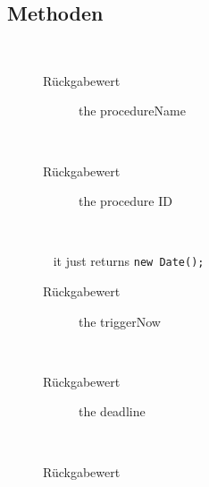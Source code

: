 \subsection{Methoden}
\begin{description}
\item[{\label{ontologyFramework.OFProcedureManagment.ProcedureConcurrenceData.getProcedureName()}}]
~ 
\begin{description}
\item[Rückgabewert] 
the procedureName
\end{description}
\item[{\label{ontologyFramework.OFProcedureManagment.ProcedureConcurrenceData.getID()}}]
~ 
\begin{description}
\item[Rückgabewert] 
the procedure ID
\end{description}
\item[{\label{ontologyFramework.OFProcedureManagment.ProcedureConcurrenceData.toString()}}]
~ 
\item[{\label{ontologyFramework.OFProcedureManagment.ProcedureConcurrenceData.getTriggerNow()}}]
~ it just returns \verb!new Date();!
\begin{description}
\item[Rückgabewert] 
the triggerNow
\end{description}
\item[{\label{ontologyFramework.OFProcedureManagment.ProcedureConcurrenceData.getDeadline()}}]
~ 
\begin{description}
\item[Rückgabewert] 
the deadline
\end{description}
\item[{\label{ontologyFramework.OFProcedureManagment.ProcedureConcurrenceData.isDeadlineSetted()}}]
~ 
\begin{description}
\item[Rückgabewert] 

\end{description}
\end{description}

